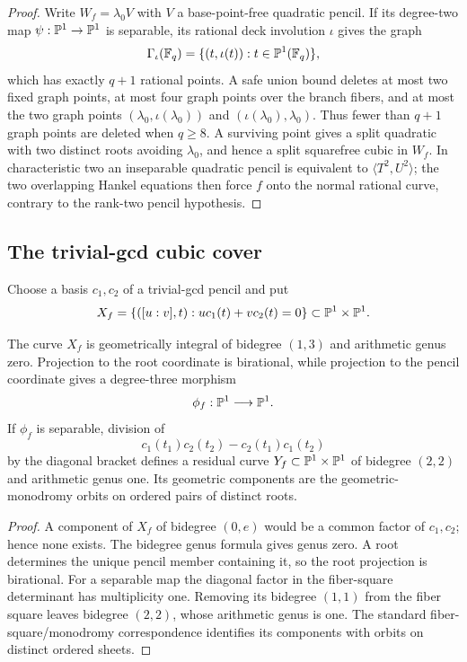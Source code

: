 \begin{proof}
Write $W_f=\lambda_0V$ with $V$ a base-point-free quadratic pencil.  If
its degree-two map $\psi:\mathbb P^1\to\mathbb P^1$ is separable, its rational deck
involution $\iota$ gives the graph
\[
 \Gamma_\iota(\mathbb F_q)=\{(t,\iota(t)):t\in\mathbb P^1(\mathbb F_q)\},
\]
which has exactly $q+1$ rational points.  A safe union bound deletes at
most two fixed graph points, at most four graph points over the branch
fibers, and at most the two graph points
$(\lambda_0,\iota(\lambda_0))$ and
$(\iota(\lambda_0),\lambda_0)$.  Thus fewer than $q+1$ graph points
are deleted when $q\geq8$.  A surviving point gives a split quadratic
with two distinct roots avoiding $\lambda_0$, and hence a split
squarefree cubic in $W_f$.  In characteristic two an inseparable
quadratic pencil is equivalent to $\langle T^2,U^2\rangle$; the two
overlapping Hankel equations then force $f$ onto the normal rational
curve, contrary to the rank-two pencil hypothesis.
\end{proof}

\subsection{The trivial-gcd cubic cover}

Choose a basis $c_1,c_2$ of a trivial-gcd pencil and put
\[
 X_f=\{([u:v],t):uc_1(t)+vc_2(t)=0\}
       \subset\mathbb P^1\times\mathbb P^1.
\]

\begin{proposition}
\label{prop:r5-incidence}%
%
The curve $X_f$ is geometrically integral of bidegree $(1,3)$ and
arithmetic genus zero.  Projection to the root coordinate is
birational, while projection to the pencil coordinate gives a
degree-three morphism
\[
       \phi_f:\mathbb P^1\longrightarrow\mathbb P^1.
\]
If $\phi_f$ is separable, division of
\[
 c_1(t_1)c_2(t_2)-c_2(t_1)c_1(t_2)
\]
by the diagonal bracket defines a residual curve
$Y_f\subset\mathbb P^1\times\mathbb P^1$ of bidegree $(2,2)$ and arithmetic genus
one.  Its geometric components are the geometric-monodromy orbits on
ordered pairs of distinct roots.
\end{proposition}

\begin{proof}
A component of $X_f$ of bidegree $(0,e)$ would be a common factor of
$c_1,c_2$; hence none exists.  The bidegree genus formula gives genus
zero.  A root determines the unique pencil member containing it, so the
root projection is birational.  For a separable map the diagonal factor
in the fiber-square determinant has multiplicity one.  Removing its
bidegree $(1,1)$ from the fiber square leaves bidegree $(2,2)$, whose
arithmetic genus is one.  The standard fiber-square/monodromy
correspondence identifies its components with orbits on distinct
ordered sheets.
\end{proof}


